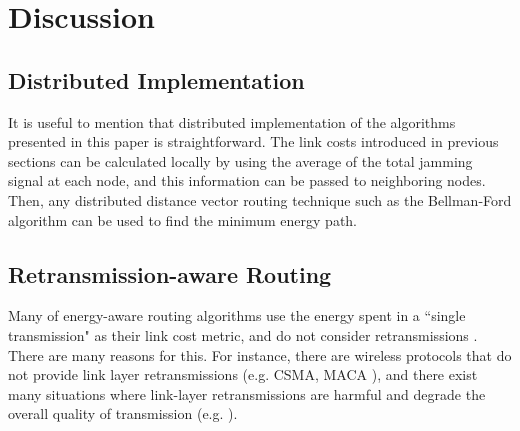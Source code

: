 \documentclass[10pt,journal]{IEEEtran}
\theoremstyle{definition}
\begin{document}
\section{Discussion}\label{sec:disc}

\subsection{Distributed Implementation}
It is useful to mention that distributed implementation of the algorithms presented in this paper is straightforward.
The link costs introduced in previous sections can be calculated locally by using the average of the total jamming signal at each node,  and this information can be passed to  neighboring nodes.
Then, any distributed distance vector routing technique such as the Bellman-Ford algorithm can be used  to find the minimum energy path. 
{\subsection{Retransmission-aware Routing}}
{Many of energy-aware routing algorithms  use  the energy spent in a
``single transmission" as their link cost metric, and do not consider retransmissions   \cite{tekbiyik2011energy}. There are many reasons for this. For instance, there are wireless  protocols that do not provide link layer retransmissions (e.g. CSMA, MACA \cite{zhu2006accurate}), and   there exist many situations where link-layer retransmissions are  harmful and degrade the overall quality of transmission (e.g. \cite{chan2008impact}).}
	
\end{document}
